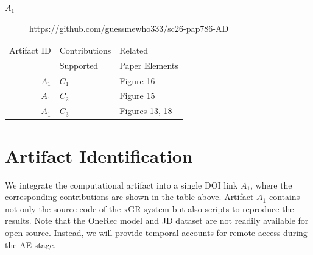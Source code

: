 \documentclass[conference]{IEEEtran}
\begin{document}
\begin{description}
\item[$A_1$] https://github.com/guessmewho333/sc26-pap786-AD
\end{description}


\begin{center}
\begin{tabular}{rll}
\toprule
Artifact ID    & Contributions &  Related \\
              &  Supported     &  Paper Elements \\
\midrule
$A_1$   &   $C_1$ & Figure 16 \\
\midrule
$A_1$    &  $C_2$ & Figure 15 \\
\midrule
$A_1$ & $C_3$ & Figures 13, 18\\
\bottomrule
\end{tabular}
\end{center}


\section{Artifact Identification}

We integrate the computational artifact into a single DOI link $A_1$, where the corresponding contributions are shown in the table above. Artifact $A_1$ contains not only the source code of the xGR system but also scripts to reproduce the results. Note that the OneRec model and JD dataset are not readily available for open source. Instead, we will provide temporal accounts for remote access during the AE stage.


\newartifact
\end{document}
